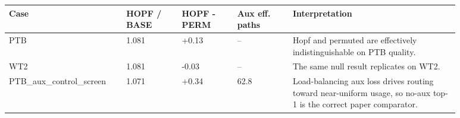 \begin{tabular}{p{0.22\linewidth}p{0.11\linewidth}p{0.11\linewidth}p{0.11\linewidth}p{0.33\linewidth}}
\toprule
Case & HOPF / BASE & HOPF - PERM & Aux eff. paths & Interpretation \\
\midrule
PTB & 1.081 & +0.13 & -- & Hopf and permuted are effectively indistinguishable on PTB quality. \\
WT2 & 1.081 & -0.03 & -- & The same null result replicates on WT2. \\
PTB\_aux\_control\_screen & 1.071 & +0.34 & 62.8 & Load-balancing aux loss drives routing toward near-uniform usage, so no-aux top-1 is the correct paper comparator. \\
\bottomrule
\end{tabular}
